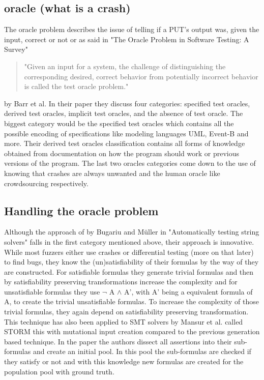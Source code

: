 \subsection{oracle (what is a crash)}
The oracle problem describes the issue of telling if a PUT's output was, given the input, correct or not or as said in "The Oracle Problem in Software Testing: A Survey"\cite{10barr2014oracleProblem} 
\begin{quote}
	"Given an input for a system, the challenge of distinguishing the corresponding desired, correct behavior from potentially incorrect behavior is called the test oracle problem."
\end{quote} by Barr et al.
In their paper they discuss four categories: specified test oracles, derived test oracles, implicit test oracles, and the absence of test oracle. The biggest category would be the specified test oracles which contains all the possible encoding of specifications like modeling languages UML, Event-B and more. Their derived test oracles classification contains all forms of knowledge obtained from documentation on how the program should work or previous versions of the program. The last two oracles categories come down to the use of knowing that crashes are always unwanted and the human oracle like crowdsourcing respectively.

\subsection{Handling the oracle problem}
Although the approach of by Bugariu and M\"uller in "Automatically testing string solvers"\cite{9bugariu2020automaticallyTestingStringSolvers} falls in the first category mentioned above, their approach is innovative. While most fuzzers either use crashes or differential testing (more on that later) to find bugs, they know the  (un)satisfiability of their formulas by the way of they are constructed. For satisfiable formulas they generate trivial formulas and then by satisfiability preserving transformations increase the complexity and for unsatisfiable formulas they use $\neg$ A $\land$ A', with A' being a equivalent formula of A, to create the trivial unsatisfiable formulas. To increase the complexity of those trivial formulas, they again depend on satisfiability preserving transformation. This technique has also been applied to SMT solvers by Mansur et al. called STORM\cite{1mansur2020detecting} this with mutational input creation compared to the previous generation based technique. In the paper the authors dissect all assertions into their sub-formulas and create an initial pool. In this pool the sub-formulas are checked if they satisfy or not and with this knowledge new formulas are created for the population pool with ground truth.

